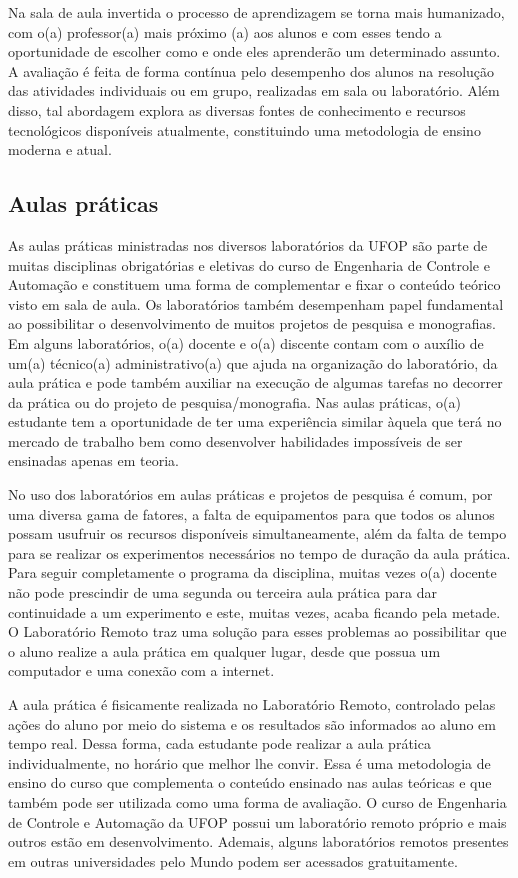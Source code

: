 Na sala de aula invertida o processo de aprendizagem se torna mais humanizado, com o(a) professor(a) mais próximo (a) aos alunos e com esses tendo a oportunidade de escolher como e onde eles aprenderão um determinado assunto. A avaliação é feita de forma contínua pelo desempenho dos alunos na resolução das atividades individuais ou em grupo, realizadas em sala ou laboratório.  Além disso, tal abordagem explora as diversas fontes de conhecimento e recursos tecnológicos disponíveis atualmente, constituindo uma metodologia de ensino moderna e atual.

\subsection*{Aulas práticas}
%
As aulas práticas ministradas nos diversos laboratórios da UFOP são parte de muitas disciplinas obrigatórias e eletivas do curso de Engenharia de Controle e Automação e constituem uma forma de complementar e fixar o conteúdo teórico visto em sala de aula. Os laboratórios também desempenham papel fundamental ao possibilitar o desenvolvimento de muitos projetos de pesquisa e monografias. Em alguns laboratórios, o(a) docente e o(a) discente contam com o auxílio de um(a) técnico(a) administrativo(a) que ajuda na organização do laboratório, da aula prática e pode também auxiliar na execução de algumas tarefas no decorrer da prática ou do projeto de pesquisa/monografia. Nas aulas práticas, o(a) estudante tem a oportunidade de ter uma experiência similar àquela que terá no mercado de trabalho bem como desenvolver habilidades impossíveis de ser ensinadas apenas em teoria.

No uso dos laboratórios em aulas práticas e projetos de pesquisa é comum, por uma diversa gama de fatores, a falta de equipamentos para que todos os alunos possam usufruir os recursos disponíveis simultaneamente, além da falta de tempo para se realizar os experimentos necessários no tempo de duração da aula prática. Para seguir completamente o programa da disciplina, muitas vezes o(a) docente não pode prescindir de uma segunda ou terceira aula prática para dar continuidade a um experimento e este, muitas vezes, acaba ficando pela metade. O Laboratório Remoto traz uma solução para esses problemas ao possibilitar que o aluno realize a aula prática em qualquer lugar, desde que possua um computador e uma conexão com a internet. 

A aula prática é fisicamente realizada no Laboratório Remoto, controlado pelas ações do aluno por meio do sistema e os resultados são informados ao aluno em tempo real. Dessa forma, cada estudante pode realizar a aula prática individualmente, no horário que melhor lhe convir. Essa é uma metodologia de ensino do curso que complementa o conteúdo ensinado nas aulas teóricas e que também pode ser utilizada como uma forma de avaliação. O curso de Engenharia de Controle e Automação da UFOP possui um laboratório remoto próprio e mais outros estão em desenvolvimento. Ademais, alguns laboratórios remotos presentes em outras universidades pelo Mundo podem ser acessados gratuitamente.   


